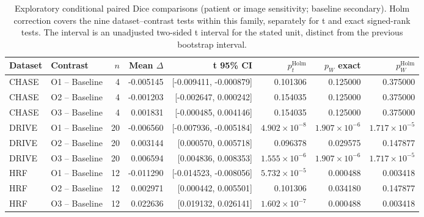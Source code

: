 \begin{table}[p]
\caption{Exploratory conditional paired Dice comparisons (patient or image sensitivity; baseline secondary). Holm correction covers the nine dataset--contrast tests within this family, separately for t and exact signed-rank tests. The interval is an unadjusted two-sided t interval for the stated unit, distinct from the previous bootstrap interval.}\label{tab:completion-patient_or_image_sensitivity-baseline_secondary}
\centering\scriptsize\setlength{\tabcolsep}{3pt}
\begin{tabular}{llrrrrrr}
\toprule
Dataset & Contrast & $n$ & Mean $\Delta$ & t 95\% CI & $p_t^{\mathrm{Holm}}$ & $p_W$ exact & $p_W^{\mathrm{Holm}}$ \\
\midrule
CHASE & O1 -- Baseline & 4 & -0.005145 & [-0.009411, -0.000879] & 0.101306 & 0.125000 & 0.375000 \\
CHASE & O2 -- Baseline & 4 & -0.001203 & [-0.002647, 0.000242] & 0.154035 & 0.125000 & 0.375000 \\
CHASE & O3 -- Baseline & 4 & 0.001831 & [-0.000485, 0.004146] & 0.154035 & 0.125000 & 0.375000 \\
DRIVE & O1 -- Baseline & 20 & -0.006560 & [-0.007936, -0.005184] & $4.902\times10^{-8}$ & $1.907\times10^{-6}$ & $1.717\times10^{-5}$ \\
DRIVE & O2 -- Baseline & 20 & 0.003144 & [0.000570, 0.005718] & 0.096378 & 0.029575 & 0.147877 \\
DRIVE & O3 -- Baseline & 20 & 0.006594 & [0.004836, 0.008353] & $1.555\times10^{-6}$ & $1.907\times10^{-6}$ & $1.717\times10^{-5}$ \\
HRF & O1 -- Baseline & 12 & -0.011290 & [-0.014523, -0.008056] & $5.732\times10^{-5}$ & 0.000488 & 0.003418 \\
HRF & O2 -- Baseline & 12 & 0.002971 & [0.000442, 0.005501] & 0.101306 & 0.034180 & 0.147877 \\
HRF & O3 -- Baseline & 12 & 0.022636 & [0.019132, 0.026141] & $1.602\times10^{-7}$ & 0.000488 & 0.003418 \\
\bottomrule
\end{tabular}
\end{table}
